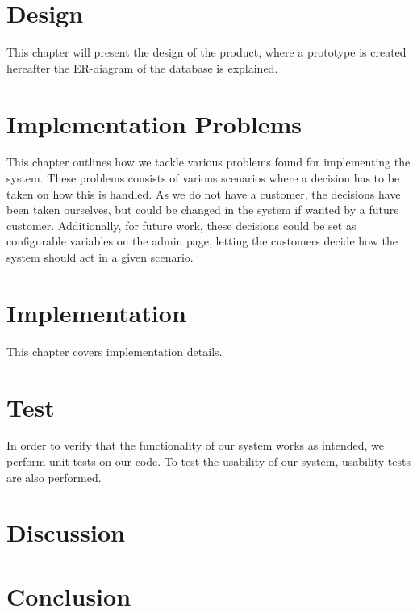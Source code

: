 	\chapter{Design}
	This chapter will present the design of the product, where a prototype is created hereafter the ER-diagram of the database is explained.
	
	
	
	
	
	
	\chapter{Implementation Problems}\label{chap:implementationproblems}
	This chapter outlines how we tackle various problems found for implementing the system.
	These problems consists of various scenarios where a decision has to be taken on how this is handled.
	As we do not have a customer, the decisions have been taken ourselves, but could be changed in the system if wanted by a future customer.
	Additionally, for future work, these decisions could be set as configurable variables on the admin page, letting the customers decide how the system should act in a given scenario.
	
	
	\chapter{Implementation}
	This chapter covers implementation details.
	
	
	
	
	
	
	
	
	
	
	
	\chapter{Test}
	In order to verify that the functionality of our system works as intended, we perform unit tests on our code. 
    To test the usability of our system, usability tests are also performed.
	
	
	
	\chapter{Discussion}
	\chapter{Conclusion}
	
	\afterpage{\thispagestyle{empty}}

	
	
	\label{lastpagewithoutappendix}

	\appendix
	
	
	
	\cleardoublepage

